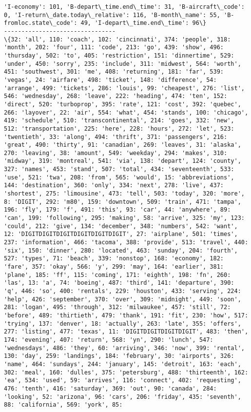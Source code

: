 \documentclass[11pt]{article}
\begin{document}
\begin{Verbatim}[commandchars=\\\{\}]
'I-economy': 101, 'B-depart\_time.end\_time': 31, 'B-aircraft\_code': 0, 'I-return\_date.today\_relative': 116, 'B-month\_name': 55, 'B-fromloc.state\_code': 49, 'I-depart\_time.end\_time': 96\}
--------------------------------
\{32: 'all', 110: 'coach', 102: 'cincinnati', 374: 'people', 318: 'month', 202: 'four', 111: 'code', 213: 'go', 439: 'show', 496: 'thursday', 502: 'to', 405: 'restriction', 151: 'dinnertime', 529: 'under', 450: 'sorry', 235: 'include', 311: 'midwest', 564: 'worth', 451: 'southwest', 301: 'me', 408: 'returning', 181: 'far', 539: 'vegas', 24: 'airfare', 498: 'ticket', 148: 'difference', 54: 'arrange', 499: 'tickets', 286: 'louis', 99: 'cheapest', 276: 'list', 546: 'wednesday', 268: 'leave', 222: 'heading', 474: 'ten', 152: 'direct', 520: 'turboprop', 395: 'rate', 121: 'cost', 392: 'quebec', 266: 'layover', 22: 'air', 554: 'what', 454: 'stands', 100: 'chicago', 419: 'schedule', 510: 'transcontinental', 214: 'goes', 332: 'new', 512: 'transportation', 225: 'here', 228: 'hours', 272: 'let', 523: 'twentieth', 33: 'along', 494: 'thrift', 371: 'passengers', 216: 'great', 490: 'thirty', 91: 'canadian', 269: 'leaves', 31: 'alaska', 270: 'leaving', 38: 'amount', 549: 'weekday', 294: 'makes', 310: 'midway', 319: 'montreal', 541: 'via', 138: 'depart', 124: 'county', 327: 'names', 453: 'stand', 507: 'total', 434: 'seventeenth', 533: 'use', 521: 'twa', 208: 'from', 565: 'would', 15: 'abbreviations', 144: 'destination', 360: 'only', 334: 'next', 278: 'live', 437: 'shortest', 275: 'limousine', 473: 'tell', 503: 'today', 320: 'more', 8: 'DIGIT', 292: 'm80', 159: 'downtown', 509: 'train', 471: 'tampa', 196: 'fly', 179: 'f', 491: 'this', 93: 'car', 44: 'anywhere', 89: 'can', 199: 'following', 295: 'making', 58: 'arrive', 325: 'my', 123: 'could', 212: 'give', 134: 'december', 348: 'numbers', 542: 'want', 12: 'DIGITDIGITDIGITDIGITDIGITDIGIT', 27: 'airplane', 501: 'times', 237: 'information', 466: 'tacoma', 388: 'provide', 513: 'travel', 440: 'six', 150: 'dinner', 280: 'located', 463: 'sunday', 204: 'fourth', 527: 'types', 71: 'beach', 339: 'nonstop', 168: 'economy', 182: 'fare', 357: 'okay', 566: 'y', 299: 'may', 164: 'earlier', 381: 'plane', 185: 'ff', 115: 'coming', 171: 'eighth', 198: 'fn', 260: 'las', 13: 'a', 74: 'boeing', 487: 'third', 141: 'departure', 390: 'q', 446: 'so', 400: 'rentals', 229: 'houston', 433: 'serving', 224: 'help', 426: 'september', 370: 'over', 309: 'midnight', 449: 'soon', 281: 'logan', 495: 'through', 312: 'milwaukee', 457: 'still', 72: 'before', 489: 'thirtieth', 479: 'thank', 191: 'fit', 230: 'how', 517: 'trying', 137: 'denver', 18: 'actually', 263: 'late', 355: 'offers', 277: 'listing', 477: 'texas', 11: 'DIGITDIGITDIGITDIGIT', 483: 'then', 174: 'evening', 407: 'return', 568: 'yn', 290: 'lunch', 547: 'wednesdays', 486: 'they', 60: 'arriving', 346: 'now', 399: 'rental', 130: 'day', 259: 'landings', 184: 'february', 30: 'airports', 326: 'name', 464: 'sundays', 244: 'january', 145: 'detroit', 163: 'each', 302: 'meal', 160: 'dulles', 375: 'petersburg', 488: 'thirteenth', 162: 'ea', 534: 'used', 59: 'arrives', 116: 'connect', 402: 'requesting', 476: 'tenth', 416: 'saturday', 369: 'out', 90: 'canada', 284: 'looking', 52: 'arizona', 96: 'cars', 206: 'friday', 435: 'seventh', 88: 'california', 569: 'york', 85: 
\end{Verbatim}
\end{document}
